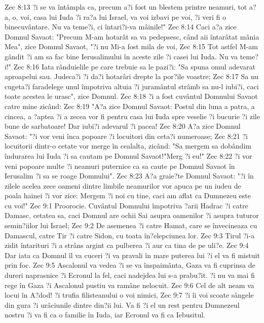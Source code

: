 Zec 8:13  ?i se va întâmpla ca, precum a?i fost un blestem printre neamuri, tot a?a, o, voi, casa lui Iuda ?i ra?a lui Israel, va voi izbavi pe voi, ?i veri fi o binecuvântare. Nu va teme?i, ci întari?i-va mâinile!"
Zec 8:14  Caci a?a zice Domnul Savaot: "Precum M-am hotarât sa va pedepsesc, când aii întarâtat mânia Mea", zice Domnul Savaot, "?i nu Mi-a fost mila de voi,
Zec 8:15  Tot astfel M-am gândit ?i am sa fac bine Ierusalimului în aceste zile ?i casei lui Iuda. Nu va teme?i!"
Zec 8:16  Iata rânduielile pe care trebuie sa le pazi?i: "Sa spuna omul adevarat aproapelui sau. Judeca?i ?i da?i hotarâri drepte la por?ile voastre;
Zec 8:17  Sa nu cugeta?i faradelege unul împotriva altuia ?i juramântul strâmb sa nu-l iubi?i, caci toate acestea le urasc", zice Domnul.
Zec 8:18  ?i a fost cuvântul Domnului Savaot catre mine zicând:
Zec 8:19  "A?a zice Domnul Savaot: Postul din luna a patra, a cincea, a ?aptea ?i a zecea vor fi pentru casa lui Iuda spre veselie ?i bucurie ?i zile bune de sarbatoare! Dar iubi?i adevarul ?i pacea!
Zec 8:20  A?a zice Domnul Savaot: "?i vor veni înca popoare ?i locuitori din ceta?i numeroase;
Zec 8:21  ?i locuitorii dintr-o cetate vor merge în cealalta, zicând: "Sa mergem sa dobândim îndurarea lui Iuda ?i sa cautam pe Domnul Savaot!"Merg ?i eu!"
Zec 8:22  ?i vor veni popoare multe ?i neamuri puternice ca sa caute pe Domnul Savaot în Ierusalim ?i sa se roage Domnului".
Zec 8:23  A?a graie?te Domnul Savaot: "?i în zilele acelea zece oameni dintre limbile neamurilor vor apuca pe un iudeu de poala hainei ?i vor zice: Mergem ?i noi cu tine, caci am aflat ca Dumnezeu este cu voi!"
Zec 9:1  Proorocie. Cuvântul Domnului împotriva ?arii Hadrac ?i catre Damasc, cetatea sa, caci Domnul are ochii Sai asupra oamenilor ?i asupra tuturor semin?iilor lui Israel;
Zec 9:2  De asemenea ?i catre Hamat, care se învecineaza cu Damascul, catre Tir ?i catre Sidon, cu toata în?elepciunea lor.
Zec 9:3  Tirul ?i-a zidit întarituri ?i a strâns argint ca pulberea ?i aur ca tina de pe uli?e.
Zec 9:4  Dar iata ca Domnul îl va cuceri ?i va pravali în mare puterea lui ?i el va fi mistuit prin foc.
Zec 9:5  Ascalonul va vedea ?i se va înspaimânta, Gaza va fi cuprinsa de dureri naprasnice ?i Ecronul la fel, caci nadejdea lui s-a prabu?it. ?i nu va mai fi rege în Gaza ?i Ascalonul pustiu va ramâne nelocuit.
Zec 9:6  Cel de alt neam va locui în A?dod! ?i trufia filisteanului o voi nimici,
Zec 9:7  ?i îi voi scoate sângele din gura ?i urâciunile dintre din?ii lui. Va fi ?i el un rest pentru Dumnezeul nostru ?i va fi ca o familie în Iuda, iar Ecronul va fi ca Iebusitul.
